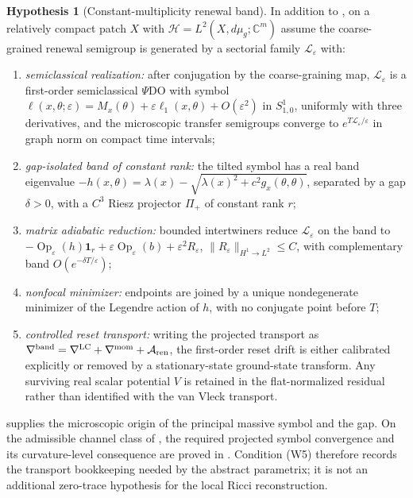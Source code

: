 \documentclass[11pt]{article}
\theoremstyle{definition}
\newtheorem{hypothesis}[theorem]{Hypothesis}
\theoremstyle{remark}
\newcommand{\C}{\mathbb C}
\newcommand{\eps}{\varepsilon}
\newcommand{\ren}{\mathrm{ren}}
\newcommand{\LC}{\mathrm{LC}}
\newcommand{\mom}{\mathrm{mom}}
\begin{document}
\begin{hypothesis}[Constant-multiplicity renewal band]
\label{hyp:wkb}
In addition to , on a relatively compact patch $X$ with
$\mathcal H=L^2(X,d\mu_g;\C^m)$ assume the coarse-grained renewal semigroup is
generated by a sectorial family $\mathcal L_\eps$ with:
\begin{enumerate}[label=\textup{(W\arabic*)},leftmargin=2.9em]
\item \emph{semiclassical realization:} after conjugation by the coarse-graining
map, $\mathcal L_\eps$ is a first-order semiclassical $\Psi$DO with symbol
$\ell(x,\theta;\eps)=M_x(\theta)+\eps\ell_1(x,\theta)+O(\eps^2)$ in $S^1_{1,0}$,
uniformly with three derivatives, and the microscopic transfer semigroups
converge to $e^{T\mathcal L_\eps/\eps}$ in graph norm on compact time intervals;
\item \emph{gap-isolated band of constant rank:} the tilted symbol has a real
band eigenvalue
$-h(x,\theta)=\lambda(x)-\sqrt{\lambda(x)^2+c^2g_x(\theta,\theta)}$,
separated by a gap $\delta>0$, with a $C^3$ Riesz projector $\Pi_+$ of constant
rank $r$;
\item \emph{matrix adiabatic reduction:} bounded intertwiners reduce
$\mathcal L_\eps$ on the band to
$-\operatorname{Op}_\eps(h)\mathbf 1_r+
 \eps\operatorname{Op}_\eps(b)+\eps^2R_\eps$,
$\|R_\eps\|_{H^1\to L^2}\le C$, with complementary band
$O(e^{-\delta T/\eps})$;
\item \emph{nonfocal minimizer:} endpoints are joined by a unique nondegenerate
minimizer of the Legendre action of $h$, with no conjugate point before $T$;
\item \emph{controlled reset transport:} writing the projected transport as
$\nabla^{\rm band}=\nabla^{\LC}+\nabla^{\mom}+\mathcal A_{\ren}$, the
first-order reset drift is either calibrated explicitly or removed by a
stationary-state ground-state transform.  Any surviving real scalar potential
$V$ is retained in the flat-normalized residual rather than identified with the
van Vleck transport.
\end{enumerate}
 supplies the microscopic origin of the
principal massive symbol and the gap.  On the admissible channel class of
, the required projected symbol convergence
and its curvature-level consequence are proved in
.
Condition \textup{(W5)} therefore records the transport bookkeeping needed by
the abstract parametrix; it is not an additional zero-trace hypothesis for the
local Ricci reconstruction.
\end{hypothesis}
\end{document}
